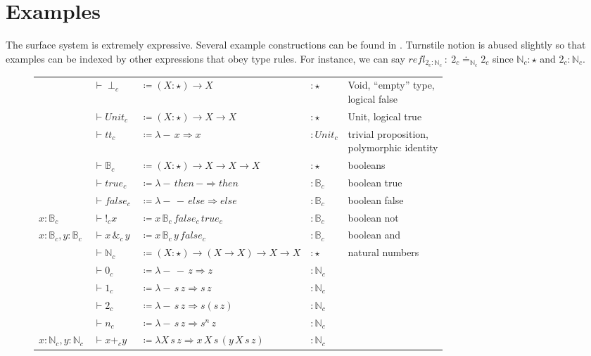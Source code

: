 \section{Examples}

The surface system is extremely expressive.
Several example \slang{} constructions can be found in .
Turnstile notion is abused slightly so that examples can be indexed by other expressions that obey type rules.
For instance, we can say $refl_{2_{c}:\mathbb{N}_{c}}\ :\ 2_{c}\doteq_{\mathbb{N}_{c}}2_{c}$ since $\mathbb{N}_{c}:\star$ and $2_{c}:\mathbb{N}_{c}$.

\begin{sidewaysfigure}
\begin{tabular}{lllll}
  & $\vdash\perp_{c}$ & $\coloneqq\left(X:\star\right)\rightarrow X$ & $:\star$ & \makecell[l]{Void, ``empty'' type,\\ logical false}\tabularnewline
  & $\vdash Unit_{c}$ & $\coloneqq\left(X:\star\right)\rightarrow X\rightarrow X$ & $:\star$ & Unit, logical true\tabularnewline
  & $\vdash tt_{c}$ & $\coloneqq\lambda-\,x\Rightarrow x$ & $:Unit_{c}$ & \makecell[l]{trivial proposition,\\ polymorphic identity}\tabularnewline
  & $\vdash\mathbb{B}_{c}$ & $\coloneqq\left(X:\star\right)\rightarrow X\rightarrow X\rightarrow X$ & $:\star$ & booleans\tabularnewline
  & $\vdash true_{c}$ & $\coloneqq\lambda-\,then\,-\Rightarrow then$ & $:\mathbb{B}_{c}$ & boolean true\tabularnewline
  & $\vdash false_{c}$ & $\coloneqq\lambda-\,-\,else\Rightarrow else$ & $:\mathbb{B}_{c}$ & boolean false\tabularnewline
$x:\mathbb{B}_{c}$ & $\vdash!_{c}x$ & $\coloneqq x\,\mathbb{B}_{c}\,false_{c}\,true_{c}$ & $:\mathbb{B}_{c}$ & boolean not\tabularnewline
$x:\mathbb{B}_{c},y:\mathbb{B}_{c}$ & $\vdash x\,\&_{c}\,y$ & $\coloneqq x\,\mathbb{B}_{c}\,y\,false_{c}$ & $:\mathbb{B}_{c}$ & boolean and\tabularnewline
  & $\vdash\mathbb{N}_{c}$ & $\coloneqq\left(X:\star\right)\rightarrow(X\rightarrow X)\rightarrow X\rightarrow X$ & $:\star$ & natural numbers\tabularnewline
  & $\vdash0_{c}$ & $\coloneqq\lambda-\,-\,z\Rightarrow z$ & $:\mathbb{N}_{c}$ & \tabularnewline
  & $\vdash1_{c}$ & $\coloneqq\lambda-\,s\,z\Rightarrow s\,z$ & $:\mathbb{N}_{c}$ & \tabularnewline
  & $\vdash2_{c}$ & $\coloneqq\lambda-\,s\,z\Rightarrow s\left(s\,z\right)$ & $:\mathbb{N}_{c}$ & \tabularnewline
  & $\vdash n_{c}$ & $\coloneqq\lambda-\,s\,z\Rightarrow s^{n}\,z$ & $:\mathbb{N}_{c}$ & \tabularnewline
$x:\mathbb{N}_{c},y:\mathbb{N}_{c}$ & $\vdash x+_{c}y$ & $\coloneqq\lambda X\,s\,z\Rightarrow x\,X\,s\,\left(y\,X\,s\,z\right)$ & $:\mathbb{N}_{c}$ & \tabularnewline

\end{tabular}
\end{sidewaysfigure}
